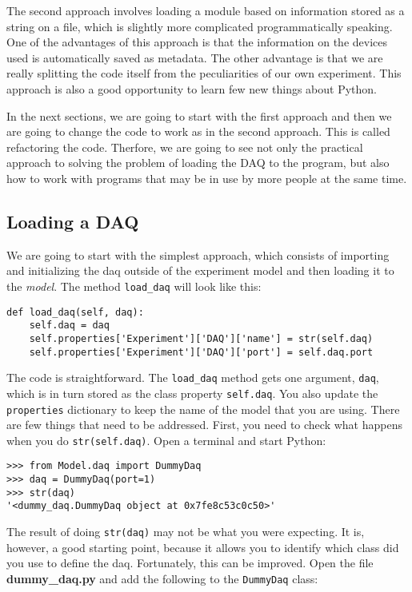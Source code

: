 {The second approach involves loading a module based on information stored as a string on a file, which is slightly more complicated programmatically speaking. One of the advantages of this approach is that the information on the devices used is automatically saved as metadata. The other advantage is that we are really splitting the code itself from the peculiarities of our own experiment. This approach is also a good opportunity to learn few new things about Python. 

In the next sections, we are going to start with the first approach and then we are going to change the code to work as in the second approach. This is called refactoring the code. Therfore, we are going to see not only the practical approach to solving the problem of loading the DAQ to the program, but also how to work with programs that may be in use by more people at the same time. 

\subsection{Loading a DAQ}\label{loading-a-daq}
We are going to start with the simplest approach, which consists of importing and initializing the daq outside of the experiment model and then loading it to the \emph{model}. The method \texttt{load_daq} will look like this:

\begin{verbatim}
def load_daq(self, daq):
    self.daq = daq
    self.properties['Experiment']['DAQ']['name'] = str(self.daq)
    self.properties['Experiment']['DAQ']['port'] = self.daq.port
\end{verbatim}

The code is straightforward. The \texttt{load_daq} method gets one
argument, \texttt{daq}, which is in turn stored as the class property \texttt{self.daq}.
You also update the \texttt{properties} dictionary to keep the name of
the model that you are using. There are few things that need to be
addressed. First, you need to check what happens when you do
\texttt{str(self.daq)}. Open a terminal and start Python:

\begin{verbatim}
>>> from Model.daq import DummyDaq
>>> daq = DummyDaq(port=1)
>>> str(daq)
'<dummy_daq.DummyDaq object at 0x7fe8c53c0c50>'
\end{verbatim}

The result of doing \texttt{str(daq)} may not be what you were
expecting. It is, however, a good starting point, because it allows you
to identify which class did you use to define the daq. Fortunately, this
can be improved. Open the file \textbf{dummy\_daq.py} and add the following to the \texttt{DummyDaq}
class:

}
